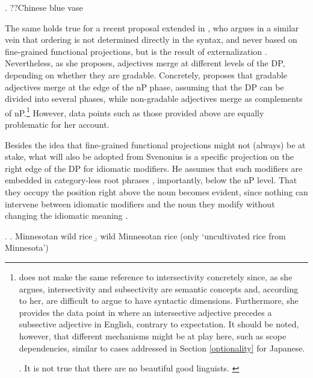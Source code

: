 \ex. ??Chinese blue vase

The same holds true for a recent proposal extended in \citet{manzini:2025:left}, who argues in a similar vein that ordering is not determined directly in the syntax, and never based on fine-grained functional projections, but is the result of externalization \citep{chomsky:2013:problems}. Nevertheless, as she proposes, adjectives merge at different levels of the DP, depending on whether they are gradable. Concretely, \citet[10–16]{manzini:2025:left} proposes that gradable adjectives merge at the edge of the nP phase, assuming that the DP can be divided into several phases, while non-gradable adjectives merge as complements of nP.\footnote{\citet{manzini:2025:left} does not make the same reference to intersectivity concretely since, as she argues, intersectivity and subsectivity are semantic concepts and, according to her, are difficult to argue to have syntactic dimensions. Furthermore, she provides the data point in \Next where an intersective adjective precedes a subsective adjective in English, contrary to expectation. It should be noted, however, that different mechanisms might be at play here, such as scope dependencies, similar to cases addressed in
Section \ref{optionality} for Japanese.

\par

\ex. It is not true that there are no beautiful good linguists. \null \hfill \citep[10]{manzini:2025:left}

\par
}
However, data points such as those provided above are equally problematic for her account.

Besides the idea that fine-grained functional projections might not (always) be at stake, what will also be adopted from Svenonius is a specific projection on the right edge of the DP for idiomatic modifiers. He assumes that such modifiers are embedded in category-less root phrases \citep{marantz:1997:no}, importantly, below the nP level. That they occupy the position right above the noun becomes evident, since nothing can intervene between idiomatic modifiers and the noun they modify without changing the idiomatic meaning \citep[36–38]{svenonius:2008:position}.

\ex. \a. Minnesotan wild rice
\b. wild Minnesotan rice (only `uncultivated rice from Minnesota’) \\ \null \hfill\citep[36–37]{svenonius:2008:position}

